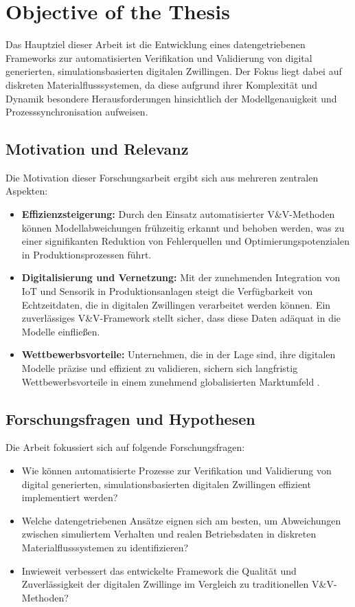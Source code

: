 \section{Objective of the Thesis}

Das Hauptziel dieser Arbeit ist die Entwicklung eines datengetriebenen Frameworks zur automatisierten Verifikation und Validierung von digital generierten, simulationsbasierten digitalen Zwillingen. Der Fokus liegt dabei auf diskreten Materialflusssystemen, da diese aufgrund ihrer Komplexität und Dynamik besondere Herausforderungen hinsichtlich der Modellgenauigkeit und Prozesssynchronisation aufweisen.

\subsection*{Motivation und Relevanz}

Die Motivation dieser Forschungsarbeit ergibt sich aus mehreren zentralen Aspekten:
\begin{itemize}
  \item \textbf{Effizienzsteigerung:} Durch den Einsatz automatisierter V\&V-Methoden können Modellabweichungen frühzeitig erkannt und behoben werden, was zu einer signifikanten Reduktion von Fehlerquellen und Optimierungspotenzialen in Produktionsprozessen führt.
  \item \textbf{Digitalisierung und Vernetzung:} Mit der zunehmenden Integration von IoT und Sensorik in Produktionsanlagen steigt die Verfügbarkeit von Echtzeitdaten, die in digitalen Zwillingen verarbeitet werden können. Ein zuverlässiges V\&V-Framework stellt sicher, dass diese Daten adäquat in die Modelle einfließen.
  \item \textbf{Wettbewerbsvorteile:} Unternehmen, die in der Lage sind, ihre digitalen Modelle präzise und effizient zu validieren, sichern sich langfristig Wettbewerbsvorteile in einem zunehmend globalisierten Marktumfeld \parencite{Grieves2014}.
\end{itemize}

\subsection*{Forschungsfragen und Hypothesen}

Die Arbeit fokussiert sich auf folgende Forschungsfragen:
\begin{itemize}
  \item Wie können automatisierte Prozesse zur Verifikation und Validierung von digital generierten, simulationsbasierten digitalen Zwillingen effizient implementiert werden?
  \item Welche datengetriebenen Ansätze eignen sich am besten, um Abweichungen zwischen simuliertem Verhalten und realen Betriebsdaten in diskreten Materialflusssystemen zu identifizieren?
  \item Inwieweit verbessert das entwickelte Framework die Qualität und Zuverlässigkeit der digitalen Zwillinge im Vergleich zu traditionellen V\&V-Methoden?
\end{itemize}

